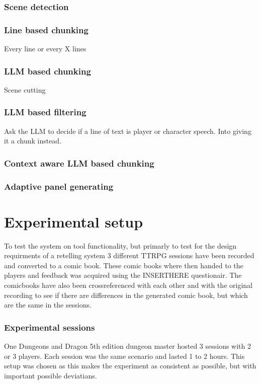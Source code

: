 \subsubsection{Scene detection}

\subsubsection{Line based chunking}
Every line or every X lines

\subsubsection{LLM based chunking}
Scene cutting

\subsubsection{LLM based filtering}
Ask the LLM to decide if a line of text is player or character speech. Into giving it a chunk instead.

\subsubsection{Context aware LLM based chunking}

\subsubsection{Adaptive panel generating}

\section{Experimental setup}
To test the system on tool functionality, but primarly to test for the design requirments of a retelling system 3 different TTRPG sessions have been recorded and converted to a comic book. These comic books where then handed to the players and feedback was acquired using the INSERTHERE questionair. The comicbooks have also been crossreferenced with each other and with the original recording to see if there are differences in the generated comic book, but which are the same in the sessions.
\subsubsection{Experimental sessions}
One Dungeons and Dragon 5th edition dungeon master hosted 3 sessions with 2 or 3 players. Each session was the same scenario and lasted 1 to 2 hours. This setup was chosen as this makes the experiment as consistent as possible, but with important possible deviatians.

